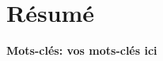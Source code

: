 \chapter*{Résumé}
\normalsize{
\begin{abstract} %

\end{abstract}
}

\medskip
{\noindent \textbf{Mots-clés: vos mots-clés ici} }
